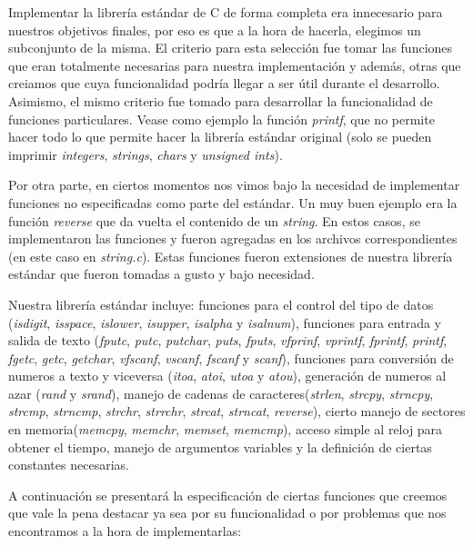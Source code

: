 \documentclass[a4paper,10pt]{article}
\begin{document}
    Implementar la librería estándar de C de forma completa era innecesario para nuestros objetivos finales, por eso es que a la hora de hacerla, elegimos un subconjunto de la misma. El criterio para esta selección fue tomar las funciones que eran totalmente necesarias para nuestra implementación y además, otras que creiamos que cuya funcionalidad podría llegar a ser útil durante el desarrollo.
    Asimismo, el mismo criterio fue tomado para desarrollar la funcionalidad de funciones particulares. Vease como ejemplo la función \textit{printf}, que no permite hacer todo lo que permite hacer la librería estándar original (solo se pueden imprimir \textit{integers}, \textit{strings}, \textit{chars} y \textit{unsigned ints}).

    Por otra parte, en ciertos momentos nos vimos bajo la necesidad de implementar funciones no especificadas como parte del estándar. Un muy buen ejemplo era la función \textit{reverse} que da vuelta el contenido de un \textit{string}. En estos casos, se implementaron las funciones y fueron agregadas en los archivos correspondientes (en este caso en \textit{string.c}). Estas funciones fueron extensiones de nuestra librería estándar que fueron tomadas a gusto y bajo necesidad.

    Nuestra librería estándar incluye: funciones para el control del tipo de datos (\textit{isdigit}, \textit{isspace}, \textit{islower}, \textit{isupper}, \textit{isalpha} y \textit{isalnum}), funciones para entrada y salida de texto (\textit{fputc}, \textit{putc}, \textit{putchar}, \textit{puts}, \textit{fputs}, \textit{vfprinf}, \textit{vprintf}, \textit{fprintf}, \textit{printf}, \textit{fgetc}, \textit{getc}, \textit{getchar}, \textit{vfscanf}, \textit{vscanf}, \textit{fscanf} y \textit{scanf}), funciones para conversión de numeros a texto y viceversa (\textit{itoa}, \textit{atoi}, \textit{utoa} y \textit{atou}), generación de numeros al azar (\textit{rand} y \textit{srand}), manejo de cadenas de caracteres(\textit{strlen}, \textit{strcpy}, \textit{strncpy}, \textit{strcmp}, \textit{strncmp}, \textit{strchr}, \textit{strrchr}, \textit{strcat}, \textit{strncat}, \textit{reverse}), cierto manejo de sectores en memoria(\textit{memcpy}, \textit{memchr}, \textit{memset}, \textit{memcmp}), acceso simple al reloj para obtener el tiempo, manejo de argumentos variables y la definición de ciertas constantes necesarias.

    A continuación se presentará la especificación de ciertas funciones que creemos que vale la pena destacar ya sea por su funcionalidad o por problemas que nos encontramos a la hora de implementarlas:
\end{document}
